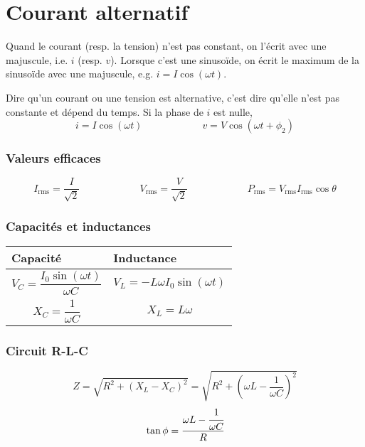 \part{Courant alternatif}
\begin{mynota}
  Quand le courant (resp. la tension) n'est pas constant, on l'écrit avec
  une majuscule, i.e. $i$ (resp. $v$).
  Lorsque c'est une sinusoïde, on écrit le maximum de la sinusoïde
  avec une majuscule, e.g. $i = I \cos(\omega t)$.
\end{mynota}
\begin{mydef}
Dire qu'un courant ou une tension est alternative, c'est dire
qu'elle n'est pas constante et dépend du temps.
Si la phase de $i$ est nulle,
\[ i = I\cos(\omega{t})
\qquad{\qquad{\qquad}}
v = V\cos{(\omega{t} + \phi_2)} \]
\end{mydef}

\section{Valeurs efficaces}
\[ I_\mathrm{rms} = \frac{I}{\sqrt{2}}\qquad{\qquad{\qquad}}V_\mathrm{rms} =
\frac{V}{\sqrt{2}}\qquad{\qquad{\qquad}}P_\mathrm{rms}
= V_\mathrm{rms}I_\mathrm{rms}\cos{\theta} \]

\section{Capacités et inductances}
\begin{table}[H]
  \begin{center}
    \begin{tabular}{m{6.5cm}|m{6.5cm}}
      \textbf{Capacité} & \textbf{Inductance}\\
      \hline
      \[ V_C = \frac{I_{0}\sin(\omega{t})}{\omega{C}}\]&\[V_{L} =
      -L\omega{}I_{0}\sin(\omega{t}) \]\\
      \[ X_C = \frac{1}{\omega{C}}\]&\[X_L = L\omega \]
    \end{tabular}
  \end{center}
\end{table}

\section{Circuit R-L-C}
\[Z = \sqrt{R^2 + (X_L - X_C)^2} =
\sqrt{R^2 + \left(\omega{L} - \frac{1}{\omega{C}}\right)^2}\]
\[\tan{\phi} = \cfrac{\omega{L} -\cfrac{1}{\omega{C}}}{R}\]

